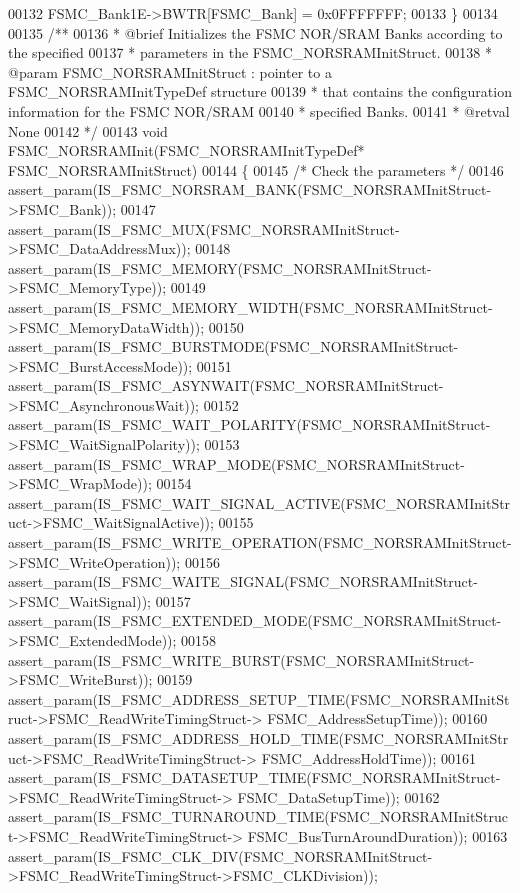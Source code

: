 \begin{DoxyCode}
00132   FSMC_Bank1E->BWTR[FSMC\_Bank] = 0x0FFFFFFF;
00133 \}
00134 
00135 \textcolor{comment}{/**}
00136 \textcolor{comment}{  * @brief  Initializes the FSMC NOR/SRAM Banks according to the specified}
00137 \textcolor{comment}{  *         parameters in the FSMC\_NORSRAMInitStruct.}
00138 \textcolor{comment}{  * @param  FSMC\_NORSRAMInitStruct : pointer to a FSMC\_NORSRAMInitTypeDef structure}
00139 \textcolor{comment}{  *         that contains the configuration information for the FSMC NOR/SRAM }
00140 \textcolor{comment}{  *         specified Banks.                       }
00141 \textcolor{comment}{  * @retval None}
00142 \textcolor{comment}{  */}
00143 \textcolor{keywordtype}{void} FSMC_NORSRAMInit(FSMC\_NORSRAMInitTypeDef* FSMC\_NORSRAMInitStruct)
00144 \{
00145   \textcolor{comment}{/* Check the parameters */}
00146   assert_param(IS\_FSMC\_NORSRAM\_BANK(FSMC\_NORSRAMInitStruct->FSMC\_Bank));
00147   assert_param(IS\_FSMC\_MUX(FSMC\_NORSRAMInitStruct->FSMC\_DataAddressMux));
00148   assert_param(IS\_FSMC\_MEMORY(FSMC\_NORSRAMInitStruct->FSMC\_MemoryType));
00149   assert_param(IS\_FSMC\_MEMORY\_WIDTH(FSMC\_NORSRAMInitStruct->FSMC\_MemoryDataWidth));
00150   assert_param(IS\_FSMC\_BURSTMODE(FSMC\_NORSRAMInitStruct->FSMC\_BurstAccessMode));
00151   assert_param(IS\_FSMC\_ASYNWAIT(FSMC\_NORSRAMInitStruct->FSMC\_AsynchronousWait));
00152   assert_param(IS\_FSMC\_WAIT\_POLARITY(FSMC\_NORSRAMInitStruct->FSMC\_WaitSignalPolarity));
00153   assert_param(IS\_FSMC\_WRAP\_MODE(FSMC\_NORSRAMInitStruct->FSMC\_WrapMode));
00154   assert_param(IS\_FSMC\_WAIT\_SIGNAL\_ACTIVE(FSMC\_NORSRAMInitStruct->FSMC\_WaitSignalActive));
00155   assert_param(IS\_FSMC\_WRITE\_OPERATION(FSMC\_NORSRAMInitStruct->FSMC\_WriteOperation));
00156   assert_param(IS\_FSMC\_WAITE\_SIGNAL(FSMC\_NORSRAMInitStruct->FSMC\_WaitSignal));
00157   assert_param(IS\_FSMC\_EXTENDED\_MODE(FSMC\_NORSRAMInitStruct->FSMC\_ExtendedMode));
00158   assert_param(IS\_FSMC\_WRITE\_BURST(FSMC\_NORSRAMInitStruct->FSMC\_WriteBurst));
00159   assert_param(IS\_FSMC\_ADDRESS\_SETUP\_TIME(FSMC\_NORSRAMInitStruct->FSMC\_ReadWriteTimingStruct->
      FSMC\_AddressSetupTime));
00160   assert_param(IS\_FSMC\_ADDRESS\_HOLD\_TIME(FSMC\_NORSRAMInitStruct->FSMC\_ReadWriteTimingStruct->
      FSMC\_AddressHoldTime));
00161   assert_param(IS\_FSMC\_DATASETUP\_TIME(FSMC\_NORSRAMInitStruct->FSMC\_ReadWriteTimingStruct->
      FSMC\_DataSetupTime));
00162   assert_param(IS\_FSMC\_TURNAROUND\_TIME(FSMC\_NORSRAMInitStruct->FSMC\_ReadWriteTimingStruct->
      FSMC\_BusTurnAroundDuration));
00163   assert_param(IS\_FSMC\_CLK\_DIV(FSMC\_NORSRAMInitStruct->FSMC\_ReadWriteTimingStruct->FSMC\_CLKDivision));

\end{DoxyCode}

